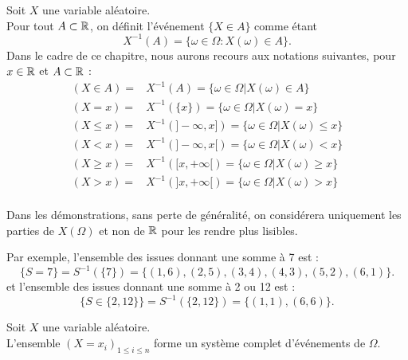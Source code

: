 \documentclass{book}
\begin{document}
\begin{Definition}
Soit $X$ une variable aléatoire.\\
Pour tout $A\subset \mathbb{R}$, on définit l'événement $\{ X \in A \}$ comme étant
\[ X^{-1}(A) = \{\omega\in\Omega :   X(\omega )\in A\}. \]
Dans le cadre de ce chapitre, nous aurons recours aux notations suivantes, pour $x \in \mathbb{R}$ et $A \subset \mathbb{R}$ :
$$\begin{aligned}
(X\in A)=&X^{-1}(A)=\{\omega  \in \Omega | X (\omega) \in A\}\\
(X = x ) =& X^{-1}(\{x\}) = \{\omega \in \Omega | X (\omega) = x \}\\
(X \leq x ) =& X^{-1}(]-\infty,x]) = \{\omega \in \Omega | X (\omega) \leq x \}\\
(X < x ) =& X^{-1}(]-\infty,x[) = \{\omega \in \Omega | X (\omega) < x \}\\
(X \geq x ) =& X^{-1}([x,+\infty[) = \{\omega \in \Omega | X (\omega) \geq x \}\\
(X > x ) =& X^{-1}(]x,+\infty[) = \{\omega \in \Omega | X (\omega) > x \}\\
\end{aligned}$$
\end{Definition}
\begin{Remarque}
Dans les démonstrations, sans perte de généralité, on considérera uniquement les parties de $X(\Omega)$ et non de $\mathbb{R}$ pour les rendre plus lisibles.
\end{Remarque}
\begin{Exemple}[Jeu]
Par exemple, l'ensemble des issues donnant une somme à 7 est :
$$\{S=7\}= S^{-1}(\{7\})=\{(1,6),(2,5),(3,4),(4,3),(5,2),(6,1)\}.$$
et l'ensemble des issues donnant une somme à 2 ou 12 est :
$$\{S\in \{2,12\}\}= S^{-1}(\{2,12\})=\{(1,1),(6,6)\}.$$
\end{Exemple}
\begin{Proposition}
Soit $X$ une variable aléatoire.\\
L'ensemble $(X=x_i)_{1\leq i\leq n}$ forme un système complet d'événements de $\Omega$.
\begin{center}
\end{center}
\end{Proposition}
\end{document}
